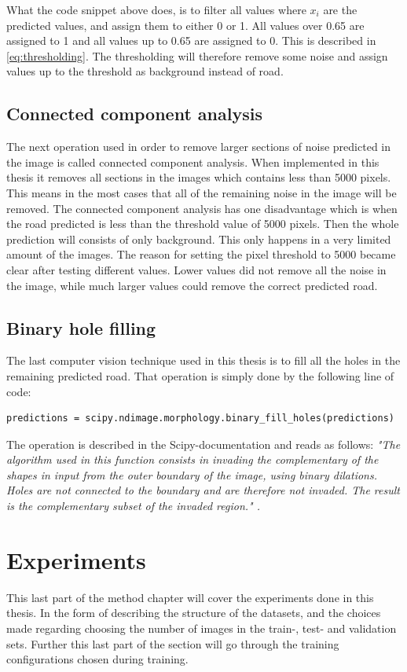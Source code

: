 \documentclass[USenglish]{ifimaster}  %
\begin{document}
What the code snippet above does, is to filter all values where $x_i$ are the predicted values, and assign them to either 0 or 1. All values over 0.65 are assigned to 1 and all values up to 0.65 are assigned to 0. This is described in \cref{eq:thresholding}. The thresholding will therefore remove some noise and assign values up to the threshold as background instead of road.  
\subsection{Connected component analysis}
The next operation used in order to remove larger sections of noise predicted in the image is called connected component analysis. When implemented in this thesis it removes all sections in the images which contains less than 5000 pixels. This means in the most cases that all of the remaining noise in the image will be removed. The connected component analysis has one disadvantage which is when the road predicted is less than the threshold value of 5000 pixels. Then the whole prediction will consists of only background. This only happens in a very limited amount of the images. The reason for setting the pixel threshold to 5000 became clear after testing different values. Lower values did not remove all the noise in the image, while much larger values could remove the correct predicted road. 
\subsection{Binary hole filling}
The last computer vision technique used in this thesis is to fill all the holes in the remaining predicted road. That operation is simply done by the following line of code:
\begin{verbatim}
predictions = scipy.ndimage.morphology.binary_fill_holes(predictions)
\end{verbatim}

The operation is described in the Scipy-documentation and reads as follows:
\newline
\newline
\textit{"The algorithm used in this function consists in invading the complementary of the shapes in input from the outer boundary of the image, using binary dilations. Holes are not connected to the boundary and are therefore not invaded. The result is the complementary subset of the invaded region." \cite{website:scipy}.} 

\section{Experiments}
This last part of the method chapter will cover the experiments done in this thesis. In the form of describing the structure of the datasets, and the choices made regarding choosing the number of images in the train-, test- and validation sets. Further this last part of the section will go through the training configurations chosen during training.  
\end{document}
